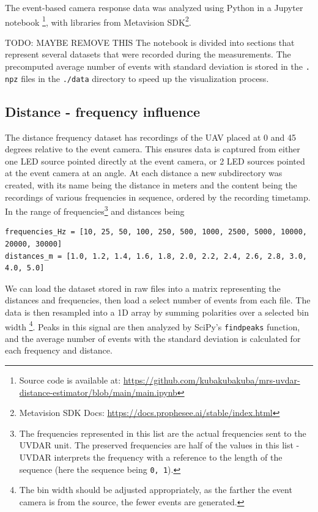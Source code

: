 The event-based camera response data was analyzed using Python in a Jupyter notebook
\footnote{Source code is available at: \url{https://github.com/kubakubakuba/mrs-uvdar-distance-estimator/blob/main/main.ipynb}},
with libraries from Metavision SDK\footnote{Metavision SDK Docs: \url{https://docs.prophesee.ai/stable/index.html}}.

\LARGE{TODO: MAYBE REMOVE THIS}
The notebook is divided into sections that represent several datasets that were recorded during the measurements.
The precomputed average number of events with standard deviation is stored in the \texttt{. npz} files in the \texttt{./data} directory to speed up the visualization process.

\subsection{Distance - frequency influence}

The distance frequency dataset has recordings of the UAV placed at 0 and 45 degrees relative to the event camera. This ensures data is captured from either
one LED source pointed directly at the event camera, or 2 LED sources pointed at the event camera at an angle. At each distance a new subdirectory was
created, with its name being the distance in meters and the content being the recordings of various frequencies in sequence, ordered by the recording timetamp.
In the range of frequencies\footnote{The frequencies represented in this list are the actual frequencies sent to the UVDAR unit. The preserved frequencies
are half of the values in this list - UVDAR interprets the frequency with a reference to the length of the sequence (here the sequence being \texttt{0, 1}).} and distances being
\begin{lstlisting}
frequencies_Hz = [10, 25, 50, 100, 250, 500, 1000, 2500, 5000, 10000, 20000, 30000]
distances_m = [1.0, 1.2, 1.4, 1.6, 1.8, 2.0, 2.2, 2.4, 2.6, 2.8, 3.0, 4.0, 5.0]
\end{lstlisting}
We can load the dataset stored in raw files into a matrix representing the distances and frequencies, then load a select number of events from each file.
The data is then resampled into a 1D array by summing polarities over a selected bin width
\footnote{The bin width should be adjusted appropriately, as the farther the event camera is from the source, the fewer events are generated.}.
Peaks in this signal are then analyzed by SciPy's \texttt{findpeaks} function,
and the average number of events with the standard deviation is calculated for each frequency and distance.

